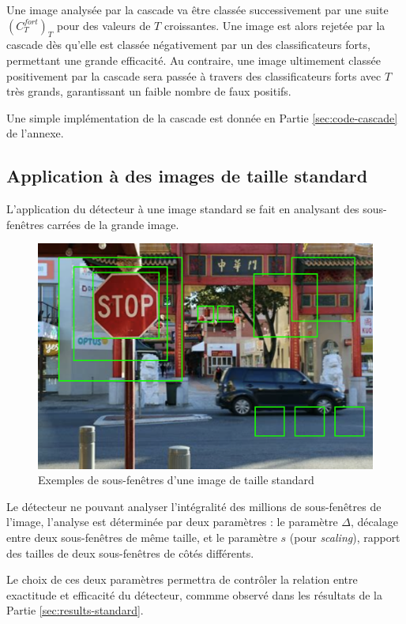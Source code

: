 \documentclass[12pt,a4paper]{article}
\begin{document}
Une image analysée par la cascade va être classée successivement par une suite $(C_T^{fort})_T$ pour des valeurs de $T$ croissantes. Une image est alors rejetée par la cascade dès qu'elle est classée négativement par un des classificateurs forts, permettant une grande efficacité. Au contraire, une image ultimement classée positivement par la cascade sera passée à travers des classificateurs forts avec $T$ très grands, garantissant un faible nombre de faux positifs.

Une simple implémentation de la cascade est donnée en Partie \ref{sec:code-cascade} de l'annexe.

\subsection{Application à des images de taille standard}
\label{sec:taille_standard}
L'application du détecteur à une image standard se fait en analysant des sous-fenêtres carrées de la grande image. 

\begin{figure}[h]
    \includegraphics[scale = 0.4]{sous-fenetre}
    \centering
    \caption{Exemples de sous-fenêtres d'une image de taille standard}
\end{figure}

Le détecteur ne pouvant analyser l'intégralité des millions de sous-fenêtres de l'image, l'analyse est déterminée par deux paramètres : le paramètre $\Delta$, décalage entre deux sous-fenêtres de même taille, et le paramètre $s$ (pour \textit{scaling}), rapport des tailles de deux sous-fenêtres de côtés différents.

Le choix de ces deux paramètres permettra de contrôler la relation entre exactitude et efficacité du détecteur, commme observé dans les résultats de la Partie \ref{sec:results-standard}.
\end{document}
